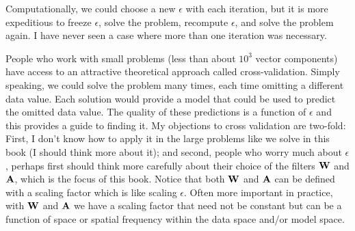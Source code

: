 \par
Computationally, we could choose a new $\epsilon$ with each iteration,
but it is more expeditious
to freeze $\epsilon$, solve the problem,
recompute $\epsilon$, and solve the problem again.
I have never seen a case where more than one iteration was necessary.

\par
People who work with small problems
(less than about $10^3$ vector components)
have access to an attractive theoretical approach
called cross-validation.
Simply speaking,
we could solve the problem many times,
each time omitting a different data value.
Each solution would provide a model
that could be used to predict
the omitted data value.
The quality of these predictions
is a function of $\epsilon$
and this provides a guide to finding it.
My objections to cross validation are two-fold:
First, I don't know how to apply it in the large problems
like we solve in this book
(I should think more about it);
and second,
people who worry much about $\epsilon$,
perhaps first should think 
more carefully about
their choice of the filters $\bold W$ and $\bold A$,
which is the focus of this book.
Notice that both $\bold W$ and $\bold A$
can be defined with a scaling factor which is like scaling $\epsilon$.
Often more important in practice,
with $\bold W$ and $\bold A$
we have a scaling factor that need not be constant but
can be a function of space or spatial frequency
within the data space and/or model space.


\begin{comment}

\section{References}

\reference{Gill, P.E., Murray, W., and Wright, M.H., 1981,
        Practical optimization:  Academic Press.
        }
\reference{Hestenes, M.R., and Stiefel, E., 1952,
        Methods of
        conjugate gradients for solving linear systems:
        J. Res. Natl. Bur. Stand., {\bf 49}, 409-436.
        }
\reference{Luenberger, D.G., 1973,
        Introduction to linear and nonlinear programming:
        Addison-Wesley.
        }
\reference{Nolet, G., 1985,
        Solving or resolving inadequate and noisy
        tomographic systems:
        J. Comp. Phys., {\bf 61}, 463-482.
        }
\reference{Paige, C.C., and Saunders, M.A., 1982a,
        LSQR: an algorithm for sparse linear equations
        and sparse least squares:
        Assn. Comp. Mach. Trans. Mathematical Software,
        {\bf 8,} 43-71.
        }
\reference{Paige, C.C., and Saunders, M.A., 1982b,
        Algorithm 583, LSQR:
        sparse linear equations and least squares problems:
        Assn. Comp. Mach. Trans. Mathematical Software,
        {\bf 8,}  195-209.
        }
\reference{Strang, G., 1986,
        Introduction to applied mathematics:
        Wellesley-Cambridge Press.
        }
\end{comment}

\clearpage

